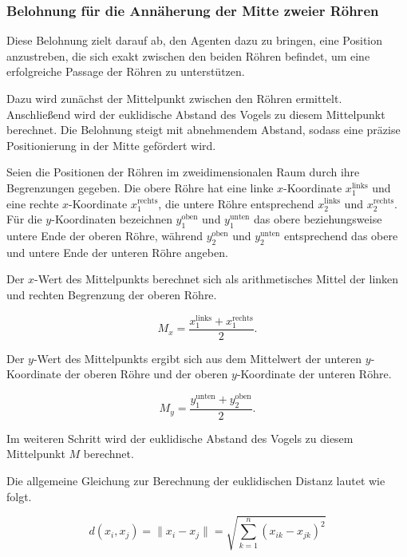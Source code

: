 \documentclass[conference]{IEEEtran}
\begin{document}
\subsubsection{Belohnung für die Annäherung der Mitte zweier Röhren}\label{reward_shaping_second}
Diese Belohnung zielt darauf ab, den Agenten dazu zu bringen, eine Position anzustreben, die sich exakt zwischen den beiden Röhren befindet, um eine erfolgreiche Passage der Röhren zu unterstützen.

Dazu wird zunächst der Mittelpunkt zwischen den Röhren ermittelt. Anschließend wird der euklidische Abstand des Vogels zu diesem Mittelpunkt berechnet. Die Belohnung steigt mit abnehmendem Abstand, sodass eine präzise Positionierung in der Mitte gefördert wird.

Seien die Positionen der Röhren im zweidimensionalen Raum durch ihre Begrenzungen gegeben. Die obere Röhre hat eine linke \(x\)-Koordinate \(x_1^{\text{links}}\) und eine rechte \(x\)-Koordinate \(x_1^{\text{rechts}}\), die untere Röhre entsprechend \(x_2^{\text{links}}\) und \(x_2^{\text{rechts}}\). Für die \(y\)-Koordinaten bezeichnen \(y_1^{\text{oben}}\) und \(y_1^{\text{unten}}\) das obere beziehungsweise untere Ende der oberen Röhre, während \(y_2^{\text{oben}}\) und \(y_2^{\text{unten}}\) entsprechend das obere und untere Ende der unteren Röhre angeben.

Der \(x\)-Wert des Mittelpunkts berechnet sich als arithmetisches Mittel der linken und rechten Begrenzung der oberen Röhre.

\begin{equation}
	M_x = \frac{x_1^{\text{links}} + x_1^{\text{rechts}}}{2}.
\end{equation}

Der \(y\)-Wert des Mittelpunkts ergibt sich aus dem Mittelwert der unteren \(y\)-Koordinate der oberen Röhre und der oberen \(y\)-Koordinate der unteren Röhre.

\begin{equation}
	M_y = \frac{y_1^{\text{unten}} + y_2^{\text{oben}}}{2}.
\end{equation}

Im weiteren Schritt wird der euklidische Abstand des Vogels zu diesem Mittelpunkt \(M\) berechnet. 

Die allgemeine Gleichung zur Berechnung der euklidischen Distanz lautet wie folgt.

\begin{equation}
	d(x_i, x_j) = \|x_i - x_j\| = \sqrt{ \sum_{k=1}^{n} (x_{ik} - x_{jk})^2 }
	\label{eq:euklidische_distanz}
\end{equation}
\end{document}
